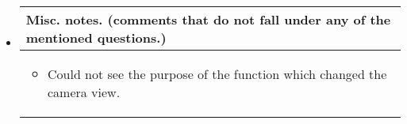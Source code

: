 \begin{itemize}
\begin{table}[!htb]
\begin{tabular}{| p{5.5in} |}
\begin{itemize}
	\end{itemize}
	\\
	\hline
\end{tabular}
\end{table}

\item[]
\begin{table}[!htb]
\centering
\begin{tabular}{| p{5.5in} |}
\hline
	\cellcolor{NotSkyBlue}\textbf{Misc. notes. (comments that do not fall under any of the mentioned questions.)}
	\\
	\hline
	\begin{itemize}
        \item Could not see the purpose of the function which changed the camera view.
	\end{itemize}
	\\
	\hline
\end{tabular}
\end{table}

\end{itemize}

\clearpage

